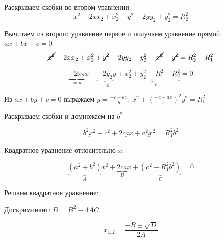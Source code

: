 \documentclass{minimal}
\begin{document}

Раскрываем скобки во втором уравнении:
$$x^2 - 2x{x_2} + x_2^2 + y^2 - 2y{y_2} + y_2^2 = {R_2^2}$$

Вычитаем из второго уравнение первое и получаем уравнение прямой $ax + bx + c = 0$:
$$\cancel{x^2} - 2x{x_2} + x_2^2 + \cancel{y^2} - 2y{y_2} + y_2^2 - \cancel{x^2} - \cancel{y^2} = {R_2^2} - {R_1^2}$$

$$\underbrace{-2{x_2}}_{= a}x + \underbrace{- 2{y_2}}_{= b}y + \underbrace{x_2^2 + y_2^2 + {R_1^2} - {R_2^2}}_{= c} = 0$$

Из $ax + by + c = 0$ выражаем $y = \frac{-c-ax}{b}$: 
$x^2 + (\frac{-c-ax}{b})^2 y^2 = R_1^2$

Раскрываем скобки и домножаем на $b^2$

$$\underline{\underline{{b^2}{x^2}}} + c^2 + \underline{2cax} + \underline{\underline{{a^2}{x^2}}} = {R_1^2}{b^2}$$

Квадратное уравнение относительно $x$:

$$\underbrace{(a^2+b^2)}_{A}x^2 + \underbrace{2ca}_{B}x + \underbrace{(c^2 - {R_1^2}{b^2})}_{C} = 0$$

Решаем квадратное уравнение:

Дискриминант: $D = B^2 - 4AC$


$$x_{1,2} = \frac{-B \pm \sqrt{D}}{2A}$$
\end{document}
